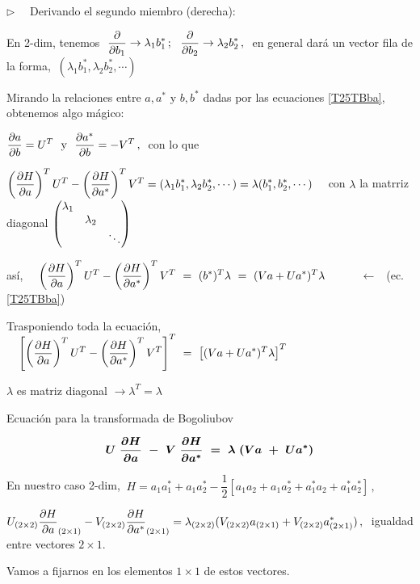 \color{Black}
$\triangleright \quad$ Derivando el segundo miembro (derecha):

En 2-dim, tenemos $\ \displaystyle \pdv{b_1} \to \lambda_1 b_1^*\, ;\ \ \pdv{b_2} \to \lambda_2 b_2^* \, , \ $ en general dará un vector fila de la forma, $\displaystyle \ ( \lambda_1 b_1^*, \lambda_2 b_2^*, \cdots )$

Mirando la relaciones entre $a,a^*$ y $b,b^*$ dadas por las ecuaciones \ref{T25TBba}, obtenemos algo mágico: 

$\displaystyle \pdv{a}{b}=U^T \ \text{ y } \ \pdv{a^*}{b}=-V^T\, , \ $ con lo que

$\displaystyle \left( \pdv{H}{a} \right)^TU^T-\left( \pdv{H}{a^*} \right)^T V^T= ( \lambda_1 b_1^*, \lambda_2 b_2^*, \cdots )=\lambda ( b_1^*, b_2^*, \cdots )\quad $ con $\lambda$  la matrriz diagonal $\mqty(\dmat{\lambda_1,\lambda_2,\ddots})$

así, $\quad \displaystyle \left( \pdv{H}{a} \right)^TU^T-\left( \pdv{H}{a^*} \right)^T V^T \ = \ (b^*)^T \lambda \ = \ (Va+Ua^*)^T \lambda \qquad \ \ $ \textcolor{gris}{$\leftarrow\ \ $ (ec. \ref{T25TBba})}

Trasponiendo toda la ecuación, $\quad \displaystyle \left[ \left( \pdv{H}{a} \right)^TU^T-\left( \pdv{H}{a^*} \right)^T V^T \right]^T \ =\  \left[ (Va+Ua^*)^T \lambda \right]^T$

$\lambda$ es matriz diagonal $\to \lambda^T=\lambda$

\begin{myblock}{Ecuación para la transformada de Bogoliubov}

\begin{large}
\begin{equation}
\label{T25TBEq}
\boldsymbol{
	U \ \pdv{H}{a} \ - \ V \ \pdv{H}{a^*} \ = \ \lambda \ (Va\ +\  Ua^*)
}
\end{equation}
\end{large}
	
\end{myblock}

\vspace{10mm} En nuestro caso 2-dim, $\ H=a_1a_1^*+a_1a_2^*-\dfrac 1 2 [a_1a_2+a_1a_2^*+a_1^*a_2+a_1^*a_2^*]\, , \ $

$\displaystyle U_{(2\times 2)}  \pdv{H}{a}_{(2\times 1)}   -  V_{(2\times 2)}   \pdv{H}{a^*}_{(2\times 1)}   =  \lambda_{(2\times 2)}   (V_{(2\times 2)} a _{(2\times 1)} +  V_{(2\times 2)} a_{(2\times 1)}^*)\, , \ $ igualdad entre vectores $2\times 1$.

Vamos a fijarnos en los elementos $1\times 1$ de estos vectores.

